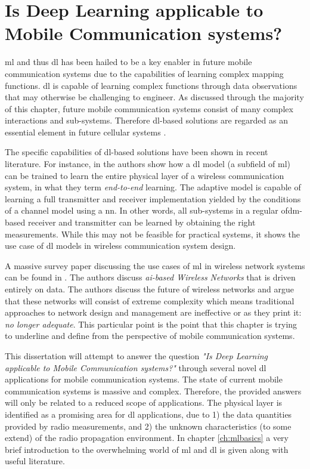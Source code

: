 \section{Is Deep Learning applicable to Mobile Communication systems?}
\gls{ml} and thus \gls{dl} has been hailed to be a key enabler in future mobile communication systems due to the capabilities of learning complex mapping functions. \gls{dl} is capable of learning complex functions through data observations that may otherwise be challenging to engineer. As discussed through the majority of this chapter, future mobile communication systems consist of many complex interactions and sub-systems. Therefore \gls{dl}-based solutions are regarded as an essential element in future cellular systems \cite{Li2017IntelligentIntelligence, Klaine2017ANetworks}. 
 
The specific capabilities of \gls{dl}-based solutions have been shown in recent literature. For instance, in \cite{OShea2017, Dorner2018, Aoudia2018} the authors show how a \gls{dl} model (a subfield of \gls{ml}) can be trained to learn the entire physical layer of a wireless communication system, in what they term \emph{end-to-end} learning. The adaptive model is capable of learning a full transmitter and receiver implementation yielded by the conditions of a channel model using a \gls{nn}. In other words, all sub-systems in a regular \gls{ofdm}-based receiver and transmitter can be learned by obtaining the right measurements. While this may not be feasible for practical systems, it shows the use case of \gls{dl} models in wireless communication system design.


A massive survey paper discussing the use cases of \gls{ml} in wireless network systems can be found in \cite{Zappone2019}. The authors discuss \emph{\gls{ai}-based Wireless Networks} that is driven entirely on data. The authors discuss the future of wireless networks and argue that these networks will consist of extreme complexity which means traditional approaches to network design and management are ineffective or as they print it: \emph{no longer adequate}. This particular point is the point that this chapter is trying to underline and define from the perspective of mobile communication systems. 


This dissertation will attempt to answer the question \emph{"Is Deep Learning applicable to Mobile Communication systems?"} through several novel \gls{dl} applications for mobile communication systems. The state of current mobile communication systems is massive and complex. Therefore, the provided answers will only be related to a reduced scope of applications. The physical layer is identified as a promising area for \gls{dl} applications, due to 1) the data quantities provided by radio measurements, and 2) the unknown characteristics (to some extend) of the radio propagation environment.  In chapter \ref{ch:mlbasics} a very brief introduction to the overwhelming world of \gls{ml} and \gls{dl} is given along with useful literature. 